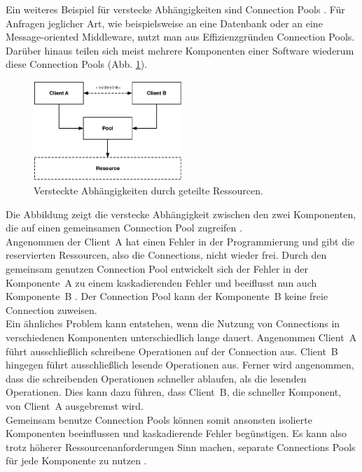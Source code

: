Ein weiteres Beispiel für verstecke Abhängigkeiten sind Connection Pools \cite[S.~214]{newman_building_2015}. Für Anfragen jeglicher Art, wie beispielsweise an eine Datenbank oder an eine Message-oriented Middleware, nutzt man aus Effizienzgründen Connection Pools. Darüber hinaus teilen sich meist mehrere Komponenten einer Software wiederum diese Connection Pools (Abb. \ref{fig:no-bulkheads}).  

\begin{figure}[H]
 \centering
 \includegraphics[width=0.5\textwidth]{4-Hauptteil/bulkheads/no-bulkheads.eps}
 \caption{Versteckte Abhängigkeiten durch geteilte Ressourcen.}
 \label{fig:no-bulkheads}
\end{figure}

Die Abbildung zeigt die verstecke Abhängigkeit zwischen den zwei Komponenten, die auf einen gemeinsamen Connection Pool zugreifen \cite[S.~95]{nygard_release_2007}.\\
Angenommen der Client~A hat einen Fehler in der Programmierung und gibt die reservierten Ressourcen, also die Connections, nicht wieder frei. Durch den gemeinsam genutzen Connection Pool entwickelt sich der Fehler in der Komponente~A zu einem kaskadierenden Fehler und beeiflusst nun auch Komponente~B \cite[S.~95]{nygard_release_2007} \cite[S.~214]{newman_building_2015}. Der Connection Pool kann der Komponente~B keine freie Connection zuweisen.\\
Ein ähnliches Problem kann entstehen, wenn die Nutzung von Connections in verschiedenen Komponenten unterschiedlich lange dauert. Angenommen Client~A führt ausschließlich schreibene Operationen auf der Connection aus. Client~B hingegen führt ausschließlich lesende Operationen aus. Ferner wird angenommen, dass die schreibenden Operationen schneller ablaufen, als die lesenden Operationen. Dies kann dazu führen, dass Client~B, die schneller Komponent, von Client~A ausgebremst wird.\\
Gemeinsam benutze Connection Pools können somit ansonsten isolierte Komponenten beeinflussen und kaskadierende Fehler begünstigen. Es kann also trotz höherer Ressourcenanforderungen Sinn machen, separate Connections Pools für jede Komponente zu nutzen \cite[S.~214]{newman_building_2015}.\\

